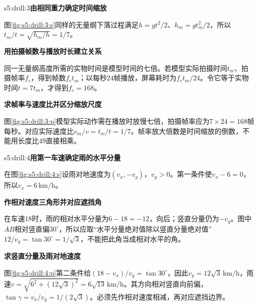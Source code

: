 \begin{drillsolution}{s5:drill:3}\textbf{由相同重力确定时间缩放}\par\nobreak
图\ref{fig:s5:drill:3:s}同样的无量纲下落过程满足$h=gt^2/2$、$h_m=gt_m^2/2$，所以$t_m/t=\sqrt{h_m/h}=1/7$。


\par\medskip{}\noindent\textbf{用拍摄帧数与播放时长建立关系}\par\nobreak
同一无量纲高度所需的实物时间是模型时间的七倍。若模型实际拍摄时间$t_m$、拍摄帧率$f_c$，得到帧数$f_ct_m$；以每秒$24$帧播放，屏幕耗时为$f_ct_m/24$。令它等于实物时间$t=7t_m$，才得到$f_c=168$。



\par\medskip{}\noindent\textbf{求帧率与速度比并区分缩放尺度}\par\nobreak
图\ref{fig:s5:drill:3:p}模型实际动作需在播放时放慢七倍，拍摄帧率应为$7\times24=168$帧每秒。对应实际速度比$v_m/v=t_m/t=1/7$。帧率放大倍数是时间缩放的倒数，不能用长度比$49$直接相乘。\end{drillsolution}
\begin{drillsolution}{s5:drill:4}\textbf{用第一车速确定雨的水平分量}\par\nobreak
在图\ref{fig:s5:drill:4:s}设雨对地速度为$(v_x,-v_y)$，$v_y>0$。第一条件使$v_x-6=0$，所以$v_x=6\,\mathrm{km/h}$。


\par\medskip{}\noindent\textbf{作相对速度三角形并对应遮挡角}\par\nobreak
在车速$18$时，雨的相对水平分量为$6-18=-12$，向后；竖直分量仍为$-v_y$。图中$AB$相对竖直偏$30^\circ$，所以应取“水平分量绝对值除以竖直分量绝对值”$12/v_y=\tan30^\circ=1/\sqrt3$，不能把此角当成相对水平的角。



\par\medskip{}\noindent\textbf{求竖直分量及雨对地速度}\par\nobreak
图\ref{fig:s5:drill:4:p}第二条件给$(18-v_x)/v_y=\tan30^\circ$，因此$v_y=12\sqrt3\,\mathrm{km/h}$，雨速$v=\sqrt{6^2+(12\sqrt3)^2}=6\sqrt{13}\,\mathrm{km/h}$。其方向相对竖直向前偏，$\tan\gamma=v_x/v_y=1/(2\sqrt3)$。必须先作相对速度相减，再对应遮挡边界。\end{drillsolution}
